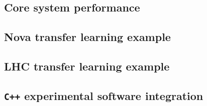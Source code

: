 \subsection{Core system performance}


\subsection{Nova transfer learning example}


\subsection{LHC transfer learning example}


\subsection{{\tt{C++}} experimental software integration }
